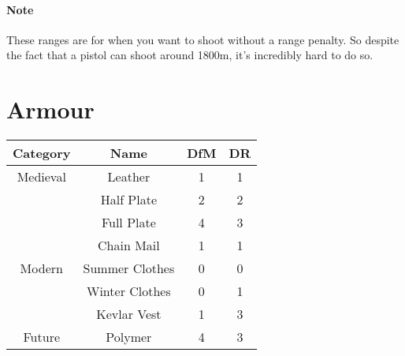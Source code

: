 \paragraph{Note} These ranges are for when you want to shoot without a range penalty.
So despite the fact that a pistol can shoot around 1800m, it's incredibly hard to do so.

\section{Armour}
\begin{center}
\begin{tabular}{c|c|c|c}
\textbf{Category} & \textbf{Name}  & \textbf{DfM} & \textbf{DR}\\\hline
         Medieval & Leather       & 1 & 1 \\
                  & Half Plate     & 2 & 2 \\
                  & Full Plate     & 4 & 3 \\
                  & Chain Mail     & 1 & 1 \\\hline
           Modern & Summer Clothes & 0 & 0 \\
                  & Winter Clothes & 0 & 1 \\
                  & Kevlar Vest    & 1 & 3 \\\hline
           Future & Polymer        & 4 & 3 \\
\end{tabular}
\end{center}